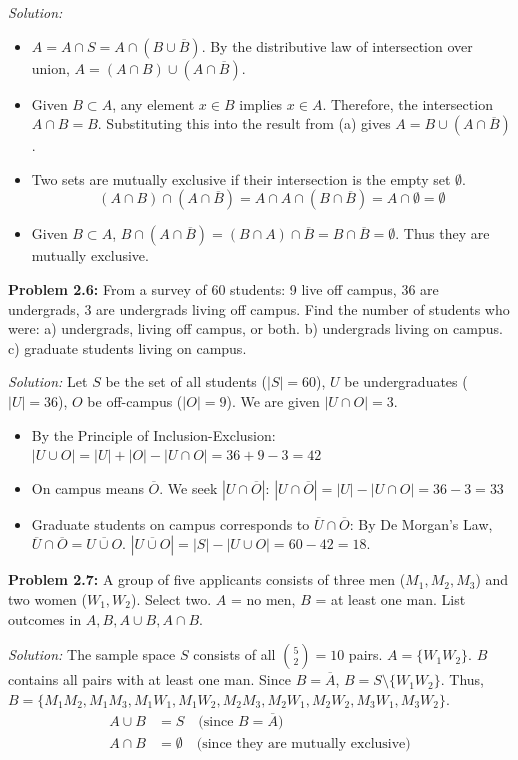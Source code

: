 \documentclass[11pt]{article}
\newcommand{\prob}[1]{\vspace{4mm}\noindent\textbf{Problem #1:}}
\newcommand{\sol}{\vspace{2mm}\noindent\textit{Solution: }}
\begin{document}
\sol 
\begin{itemize}
    \item[\textbf{a)}] $A = A \cap S = A \cap (B \cup \overline{B})$. By the distributive law of intersection over union, $A = (A \cap B) \cup (A \cap \overline{B})$.
    \item[\textbf{b)}] Given $B \subset A$, any element $x \in B$ implies $x \in A$. Therefore, the intersection $A \cap B = B$. Substituting this into the result from (a) gives $A = B \cup (A \cap \overline{B})$.
    \item[\textbf{c)}] Two sets are mutually exclusive if their intersection is the empty set $\emptyset$.
    \[ (A \cap B) \cap (A \cap \overline{B}) = A \cap A \cap (B \cap \overline{B}) = A \cap \emptyset = \emptyset \]
    \item[\textbf{d)}] Given $B \subset A$, $B \cap (A \cap \overline{B}) = (B \cap A) \cap \overline{B} = B \cap \overline{B} = \emptyset$. Thus they are mutually exclusive.
\end{itemize}

\prob{2.6}
From a survey of 60 students: 9 live off campus, 36 are undergrads, 3 are undergrads living off campus. Find the number of students who were:
a) undergrads, living off campus, or both.
b) undergrads living on campus.
c) graduate students living on campus.

\sol 
Let $S$ be the set of all students ($|S|=60$), $U$ be undergraduates ($|U|=36$), $O$ be off-campus ($|O|=9$). We are given $|U \cap O| = 3$.
\begin{itemize}
    \item[\textbf{a)}] By the Principle of Inclusion-Exclusion:
    $ |U \cup O| = |U| + |O| - |U \cap O| = 36 + 9 - 3 = 42 $
    \item[\textbf{b)}] On campus means $\overline{O}$. We seek $|U \cap \overline{O}|$:
    $ |U \cap \overline{O}| = |U| - |U \cap O| = 36 - 3 = 33 $
    \item[\textbf{c)}] Graduate students on campus corresponds to $\overline{U} \cap \overline{O}$:
    By De Morgan's Law, $\overline{U} \cap \overline{O} = \overline{U \cup O}$. 
    $ |\overline{U \cup O}| = |S| - |U \cup O| = 60 - 42 = 18 $.
\end{itemize}

\prob{2.7}
A group of five applicants consists of three men ($M_1, M_2, M_3$) and two women ($W_1, W_2$). Select two. $A$ = no men, $B$ = at least one man. List outcomes in $A, B, A \cup B, A \cap B$.

\sol 
The sample space $S$ consists of all $\binom{5}{2} = 10$ pairs.
$A = \{W_1 W_2\}$. 
$B$ contains all pairs with at least one man. Since $B = \overline{A}$, $B = S \setminus \{W_1 W_2\}$. Thus,
$B = \{M_1 M_2, M_1 M_3, M_1 W_1, M_1 W_2, M_2 M_3, M_2 W_1, M_2 W_2, M_3 W_1, M_3 W_2\}$.
\begin{align*}
    A \cup B &= S \quad \text{(since } B = \overline{A} \text{)} \\
    A \cap B &= \emptyset \quad \text{(since they are mutually exclusive)}
\end{align*}
\end{document}
